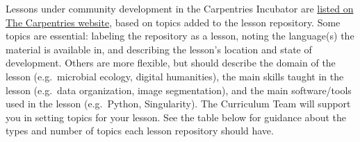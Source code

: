 \documentclass[
]{book}
\begin{document}
Lessons under community development in the Carpentries Incubator are
\href{https://carpentries.org/community-lessons/}{listed on The Carpentries website},
based on topics added to the lesson repository.
Some topics are essential:
labeling the repository as a lesson,
noting the language(s) the material is available in,
and describing the lesson's location and state of development.
Others are more flexible,
but should describe the domain of the lesson
(e.g.~microbial ecology, digital humanities),
the main skills taught in the lesson
(e.g.~data organization, image segmentation),
and the main software/tools used in the lesson
(e.g.~Python, Singularity).
The Curriculum Team will support you in setting topics for your lesson.
See the table below for guidance about the types and number of topics each
lesson repository should have.
\end{document}

